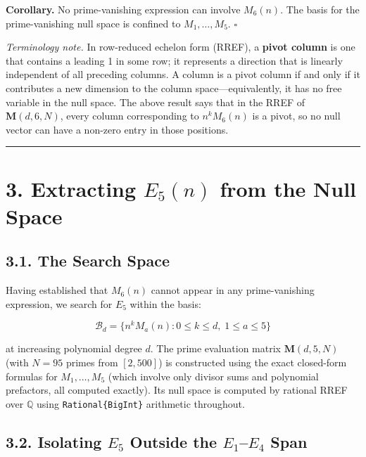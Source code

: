 \documentclass[
  11pt,
]{article}
\begin{document}
\textbf{Corollary.} No prime-vanishing expression can involve
\(M_6(n)\). The basis for the prime-vanishing null space is confined to
\(M_1, \ldots, M_5\). \(\square\)

\emph{Terminology note.} In row-reduced echelon form (RREF), a
\textbf{pivot column} is one that contains a leading 1 in some row; it
represents a direction that is linearly independent of all preceding
columns. A column is a pivot column if and only if it contributes a new
dimension to the column space---equivalently, it has no free variable in
the null space. The above result says that in the RREF of
\(\mathbf{M}(d,6,N)\), every column corresponding to \(n^k M_6(n)\) is a
pivot, so no null vector can have a non-zero entry in those positions.

\begin{center}\rule{0.5\linewidth}{0.5pt}\end{center}

\section{\texorpdfstring{3. Extracting \(E_5(n)\) from the Null
Space}{3. Extracting E\_5(n) from the Null Space}}\label{extracting-e_5n-from-the-null-space}

\subsection{3.1. The Search Space}\label{the-search-space}

Having established that \(M_6(n)\) cannot appear in any prime-vanishing
expression, we search for \(E_5\) within the basis:

\[\mathcal{B}_d = \{ n^k M_a(n) : 0 \leq k \leq d,\; 1 \leq a \leq 5 \}\]

at increasing polynomial degree \(d\). The prime evaluation matrix
\(\mathbf{M}(d, 5, N)\) (with \(N = 95\) primes from \([2,500]\)) is
constructed using the exact closed-form formulas for \(M_1,\ldots,M_5\)
(which involve only divisor sums and polynomial prefactors, all computed
exactly). Its null space is computed by rational RREF over
\(\mathbb{Q}\) using \texttt{Rational\{BigInt\}} arithmetic throughout.

\subsection{\texorpdfstring{3.2. Isolating \(E_5\) Outside the
\(E_1\)--\(E_4\)
Span}{3.2. Isolating E\_5 Outside the E\_1--E\_4 Span}}\label{isolating-e_5-outside-the-e_1e_4-span}
\end{document}
